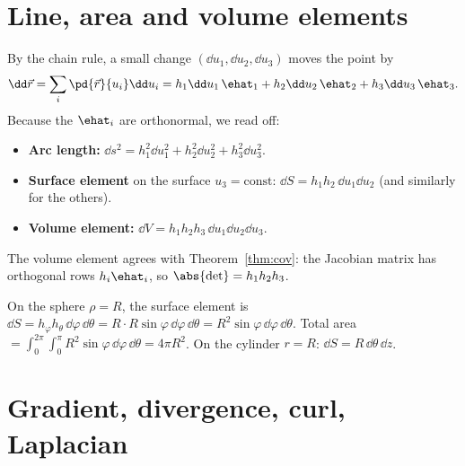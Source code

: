 \section{Line, area and volume elements}

By the chain rule, a small change $(\dd u_1,\dd u_2,\dd u_3)$ moves the point by
\[
\dd\vec r=\sum_i\pd{\vec r}{u_i}\dd u_i=h_1\dd u_1\,\ehat_1+h_2\dd u_2\,\ehat_2+h_3\dd u_3\,\ehat_3 .
\]
Because the $\ehat_i$ are orthonormal, we read off:
\begin{itemize}
  \item \textbf{Arc length:} $\dd s^2=h_1^2\dd u_1^2+h_2^2\dd u_2^2+h_3^2\dd u_3^2$.
  \item \textbf{Surface element} on the surface $u_3=\text{const}$: $\dd S=h_1h_2\,\dd u_1\dd u_2$ (and similarly for the others).
  \item \textbf{Volume element:} $\dd V=h_1h_2h_3\,\dd u_1\dd u_2\dd u_3$.
\end{itemize}
The volume element agrees with Theorem~\ref{thm:cov}: the Jacobian matrix has orthogonal rows $h_i\ehat_i$, so $\abs{\det}=h_1h_2h_3$.

\begin{example}
On the sphere $\rho=R$, the surface element is $\dd S=h_\varphi h_\theta\,\dd\varphi\,\dd\theta=R\cdot R\sin\varphi\,\dd\varphi\,\dd\theta=R^2\sin\varphi\,\dd\varphi\,\dd\theta$. Total area $=\int_0^{2\pi}\!\int_0^\pi R^2\sin\varphi\,\dd\varphi\,\dd\theta=4\pi R^2$. On the cylinder $r=R$: $\dd S=R\,\dd\theta\,\dd z$.
\end{example}

\section{Gradient, divergence, curl, Laplacian}

